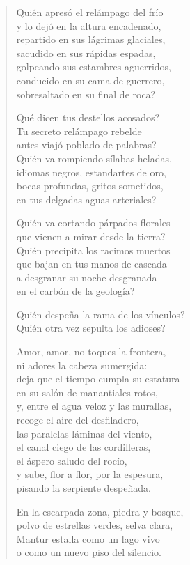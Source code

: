 \documentclass[12pt]{article}
\begin{document}
\begin{verse}
Quién apresó el relámpago del frío\\
y lo dejó en la altura encadenado,\\
repartido en sus lágrimas glaciales,\\
sacudido en sus rápidas espadas,\\
golpeando sus estambres aguerridos,\\
conducido en su cama de guerrero,\\
sobresaltado en su final de roca?  

Qué dicen tus destellos acosados?\\
Tu secreto relámpago rebelde\\
antes viajó poblado de palabras?\\
Quién va rompiendo sílabas heladas,\\
idiomas negros, estandartes de oro,\\
bocas profundas, gritos sometidos,\\
en tus delgadas aguas arteriales?  

Quién va cortando párpados florales\\
que vienen a mirar desde la tierra?\\
Quién precipita los racimos muertos\\
que bajan en tus manos de cascada\\
a desgranar su noche desgranada\\
en el carbón de la geología?  

Quién despeña la rama de los vínculos?\\
Quién otra vez sepulta los adioses?  

Amor, amor, no toques la frontera,\\
ni adores la cabeza sumergida:\\
deja que el tiempo cumpla su estatura\\
en su salón de manantiales rotos,\\
y, entre el agua veloz y las murallas,\\
recoge el aire del desfiladero,\\
las paralelas láminas del viento,\\
el canal ciego de las cordilleras,\\
el áspero saludo del rocío,\\
y sube, flor a flor, por la espesura,\\
pisando la serpiente despeñada.  

En la escarpada zona, piedra y bosque,\\
polvo de estrellas verdes, selva clara,\\
Mantur estalla como un lago vivo\\
o como un nuevo piso del silencio.  


\end{verse}
\end{document}
